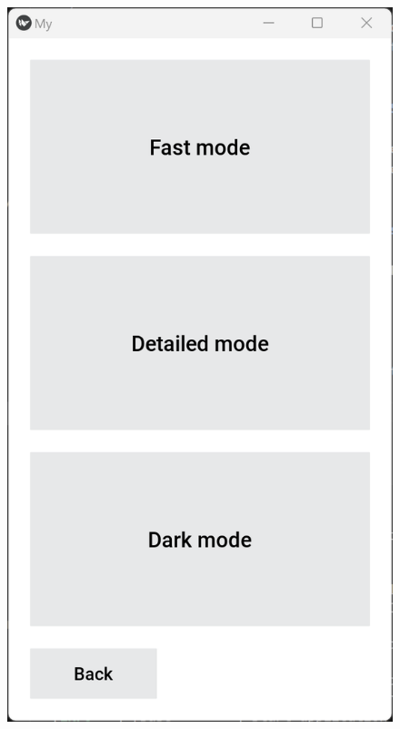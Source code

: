 \begin{figure}[h]
\begin{minipage}[b]{0.22\textwidth}
		\includegraphics[width=\linewidth]{images/settingscreen.png}
		\caption{}
		\label{fig:settingscreen}
	\end{minipage}
	\hfill
	\begin{minipage}[b]{0.22\textwidth}

\end{minipage}
\end{figure}
